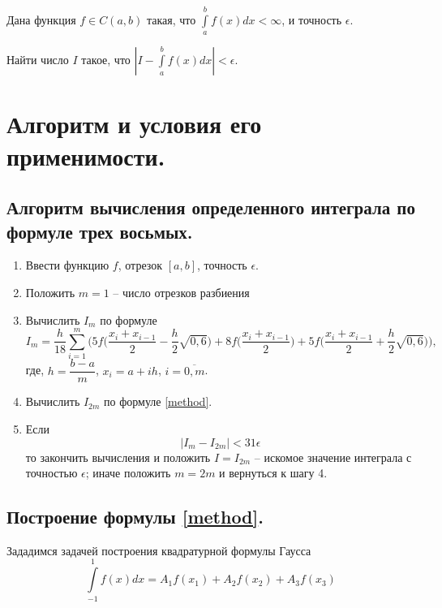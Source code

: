 \documentclass[a4paper, 12pt]{article}
\begin{document}
	Дана функция $f\in C(a,b)$ такая, что $\int\limits_a^bf(x)dx<\infty$, и точность $\epsilon$. 
	
	Найти число $I$ такое, что $|I-\int\limits_a^bf(x)dx|<\epsilon$.
	
	\section{Алгоритм и условия его применимости.}
	
	\subsection{Алгоритм вычисления определенного интеграла по формуле трех восьмых.}
	\label{alghorithm}
	
	\begin{enumerate}
		\item Ввести функцию $f$, отрезок $[a,b]$, точность $\epsilon$.
		\item Положить $m=1$ -- число отрезков разбиения
		\item Вычислить $I_m$ по формуле
		\begin{equation} \label{method}
			I_m=\frac{h}{18}\sum\limits_{i=1}^{m}\bigg(5f\bigg(\frac{x_i+x_{i-1}}{2}-\frac{h}{2}\sqrt{0,6}\bigg)+8f\bigg(\frac{x_i+x_{i-1}}{2}\bigg)+5f\bigg(\frac{x_i+x_{i-1}}{2}+\frac{h}{2}\sqrt{0,6}\bigg)\bigg),
		\end{equation}
		где, $h=\dfrac{b-a}{m}$, $x_i=a+ih$, $i=\overline{0,m}$.
		\item Вычислить $I_{2m}$ по формуле \eqref{method}.
		\item Если
		\begin{equation}
			|I_m-I_{2m}|<31\epsilon
		\end{equation}
		то закончить вычисления и положить $I=I_{2m}$ -- искомое значение интеграла с точностью $\epsilon$; иначе положить $m=2m$ и вернуться к шагу 4.
	\end{enumerate}

	\subsection{Построение формулы \eqref{method}.}
	
	Зададимся задачей построения квадратурной формулы Гаусса
	\begin{equation} \label{generalformula}
		\int\limits_{-1}^{1}f(x)dx=A_1f(x_1)+A_2f(x_2)+A_3f(x_3)
	\end{equation}
	
\end{document}
